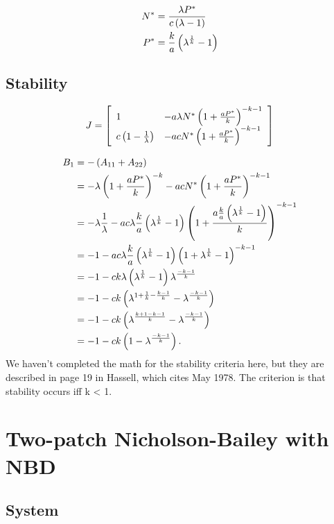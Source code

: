 \documentclass{article}
\begin{document}
\begin{align*}
    N^* &= \frac{\lambda P^*}{c\left(\lambda - 1\right)}\\
    P^* &= \frac{k}{a} \left(\lambda^{\frac{1}{k}} - 1\right)
\end{align*}

\subsection{Stability}
\newcommand{\aPK}{\frac{aP^*}{k}}
\newcommand{\fol}{\frac{1}{\lambda}}
\newcommand{\fok}{\frac{1}{k}}
\newcommand{\fka}{\frac{k}{a}}
\begin{equation*}
J = \left[ \begin{array}{ll}
     1 & 
     -a \lambda N^* \pn{1+\frac{aP^*}{k}}^{-k-1}\\
     c \pn{1-\fol} &
     -a c N^* \pn{1 + \frac{aP^*}{k}}^{-k-1}
 \end{array} \right]
\end{equation*}

\begin{align*}
B_1 &= -\pn{A_{11} + A_{22}}\\
    &= -\lambda \pn{1+\aPK}^{-k} - acN^*\pn{1+\aPK}^{-k-1}\\
    &= -\lambda\fol - ac\lambda\fka \pn{\lambda^\fok-1} \pn{1+\frac{a \fka \pn{\lambda^\fok - 1}}{k}}^{-k-1}\\
    &= -1 - ac \lambda \fka \pn{\lambda^\fok - 1} \pn{1 + \lambda^\fok - 1}^{-k-1}\\
    &= -1 - ck\lambda \pn{\lambda^\fok -1}\lambda^{\frac{-k-1}{k}}\\
    &= -1 - ck\pn{\lambda^{1+\fok-\frac{k-1}{k}} - \lambda^{\frac{-k-1}{k}}}\\
    &= -1 - ck\pn{\lambda^{\frac{k+1-k-1}{k}} - \lambda^{\frac{-k-1}{k}}}\\
    &= -1 - ck\pn{1-\lambda^{\frac{-k-1}{k}}}.
\end{align*}
We haven't completed the math for the stability criteria here, but they are described in page 19 in Hassell, which cites May 1978. The criterion is that stability occurs iff k < 1.

\pagebreak
\section{Two-patch Nicholson-Bailey with NBD}
\subsection{System}
\end{document}
